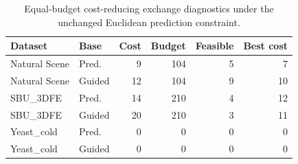 \begin{table}[htbp]
\centering\small
\caption{Equal-budget cost-reducing exchange diagnostics under the unchanged Euclidean prediction constraint.}
\begin{tabular}{llrrrr}
\hline
Dataset & Base & Cost & Budget & Feasible & Best cost\\
\hline
Natural Scene & Pred. & 9 & 104 & 5 & 7\\
Natural Scene & Guided & 12 & 104 & 9 & 10\\
SBU\_3DFE & Pred. & 14 & 210 & 4 & 12\\
SBU\_3DFE & Guided & 20 & 210 & 3 & 11\\
Yeast\_cold & Pred. & 0 & 0 & 0 & 0\\
Yeast\_cold & Guided & 0 & 0 & 0 & 0\\
\hline
\end{tabular}
\end{table}
